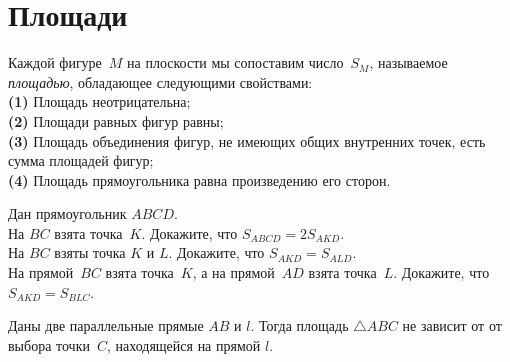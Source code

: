 
\section*{Площади}


Каждой фигуре~$M$ на плоскости мы сопоставим число~$S_M$, называемое
\emph{площадью}, обладающее следующими свойствами:
\\
\textbf{(1)}\enspace
Площадь неотрицательна;
\\
\textbf{(2)}\enspace
Площади равных фигур равны;
\\
\textbf{(3)}\enspace
Площадь объединения фигур, не имеющих общих внутренних точек, есть сумма
площадей фигур;
\\
\textbf{(4)}\enspace
Площадь прямоугольника равна произведению его сторон.

\begin{problems}

\item
Дан прямоугольник $ABCD$.
\\
\subproblem
На $BC$ взята точка~$K$.
Докажите, что $S_{ABCD} = 2 S_{AKD}$.
\\
\subproblem
На $BC$ взяты точка $K$ и $L$.
Докажите, что $S_{AKD} = S_{ALD}$.
\\
\subproblem
На прямой~$BC$ взята точка~$K$, а на прямой~$AD$ взята точка~$L$.
Докажите, что $S_{AKD} = S_{BLC}$.

\end{problems}

Даны две параллельные прямые $AB$ и $l$.
Тогда площадь $\triangle ABC$ не зависит от от выбора точки~$C$, находящейся
на прямой $l$.

